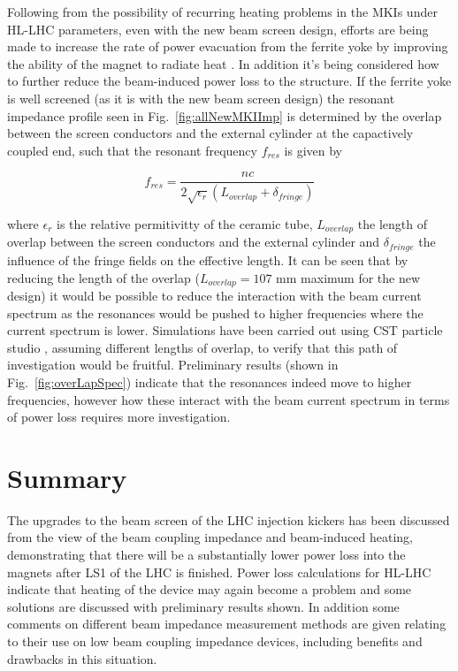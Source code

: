 \documentclass[a4paper,
              ]{jacow}
\begin{document}
Following from the possibility of recurring heating problems in the MKIs under HL-LHC parameters, even with the new beam screen design, efforts are being made to increase the rate of power evacuation from the ferrite yoke by improving the ability of the magnet to radiate heat \cite{mkiCoolling}. In addition it's being considered how to further reduce the beam-induced power loss to the structure. If the ferrite yoke is well screened (as it is with the new beam screen design) the resonant impedance profile seen in Fig.~\ref{fig:allNewMKIImp} is determined by the overlap between the screen conductors and the external cylinder at the capactively coupled end, such that the resonant frequency $f_{res}$ is given by

\begin{equation}
f_{res} = \frac{n c}{2 \sqrt{\epsilon_{r}}\left( L_{overlap} + \delta_{fringe} \right)}
\end{equation}

where $\epsilon_{r}$ is the relative permitivitty of the ceramic tube, $L_{overlap}$ the length of overlap between the screen conductors and the external cylinder and $\delta_{fringe}$ the influence of the fringe fields on the effective length. It can be seen that by reducing the length of the overlap ($L_{overlap}=107$ mm maximum for the new design) it would be possible to reduce the interaction with the beam current spectrum as the resonances would be pushed to higher frequencies where the current spectrum is lower. Simulations have been carried out using CST particle studio \cite{cst-cite}, assuming different lengths of overlap, to verify that this path of investigation would be fruitful. Preliminary results (shown in Fig.~\ref{fig:overLapSpec}) indicate that the resonances indeed move to higher frequencies, however how these interact with the beam current spectrum in terms of power loss requires more investigation.



\section{Summary}

The upgrades to the beam screen of the LHC injection kickers has been discussed from the view of the beam coupling impedance and beam-induced heating, demonstrating that there will be a substantially lower power loss into the magnets after LS1 of the LHC is finished. Power loss calculations for HL-LHC indicate that heating of the device may again become a problem and some solutions are discussed with preliminary results shown. In addition some comments on different beam impedance measurement methods are given relating to their use on low beam coupling impedance devices, including benefits and drawbacks in this situation.
\end{document}
